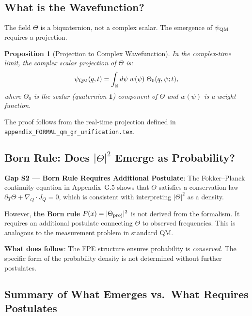\documentclass[12pt]{article}
\newtheorem{proposition}[theorem]{Proposition}
\theoremstyle{definition}
\theoremstyle{remark}
\begin{document}
\subsection{What is the Wavefunction?}

The field $\Theta$ is a biquaternion, not a complex scalar.  The emergence of
$\psi_{\rm QM}$ requires a projection.

\begin{proposition}[Projection to Complex Wavefunction]
In the complex-time limit, the complex scalar projection of $\Theta$ is:
\[
  \psi_{\rm QM}(q, t) = \int_{\mathbb{R}} d\psi \; w(\psi)\;\Theta_0(q, \psi; t),
\]
where $\Theta_0$ is the scalar (quaternion-$\mathbf{1}$) component of $\Theta$ and
$w(\psi)$ is a weight function.
\end{proposition}

The proof follows from the real-time projection defined in
\texttt{appendix\_FORMAL\_qm\_gr\_unification.tex}.

\subsection{Born Rule: Does $|\Theta|^2$ Emerge as Probability?}

\begin{gapbox}
\textbf{Gap S2 — Born Rule Requires Additional Postulate}:
The Fokker--Planck continuity equation in Appendix~G.5 shows that $\Theta$ satisfies
a conservation law $\partial_T\Theta + \nabla_Q\cdot J_Q = 0$, which is consistent with
interpreting $|\Theta|^2$ as a density.

However, \textbf{the Born rule} $P(x) = |\Theta_{\rm proj}|^2$ is not derived from the formalism.
It requires an additional postulate connecting $\Theta$ to observed frequencies.
This is analogous to the measurement problem in standard QM.

\textbf{What does follow}: The FPE structure ensures probability is \emph{conserved}.
The specific form of the probability density is not determined without further postulates.
\end{gapbox}

\subsection{Summary of What Emerges vs.\ What Requires Postulates}
\end{document}
